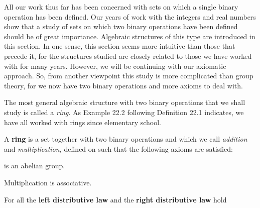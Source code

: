 \documentclass[11pt,oneside]{article}
\begin{document}
\fi
\renewcommand{\BookFooter}{Section 22 Rings and Fields}
\ifdefined\BookMaster\else\setcounter{page}{185}\fi

\BookNarrativetrue

\begin{BookBody}


\noindent All our work thus far has been concerned with sets on which a single binary operation has been defined. Our years of work with the integers and real numbers show that a study of sets on which two binary operations have been defined should be of great importance. Algebraic structures of this type are introduced in this section. In one sense, this section seems more intuitive than those that precede it, for the structures studied are closely related to those we have worked with for many years. However, we will be continuing with our axiomatic approach. So, from another viewpoint this study is more complicated than group theory, for we now have two binary operations and more axioms to deal with.


\noindent The most general algebraic structure with two binary operations that we shall study is called a\textit{ ring}. As Example 22.2 following Definition 22.1 indicates, we have all worked with rings since elementary school.

 A\textbf{ ring}  is a set  together with two binary operations \BookInline{+ } and \BookInline{\cdot,\allowbreak } which we call \textit{addition} and\textit{ multiplication,} defined on  such that the following axioms are satisfied:

 is an abelian group.

 Multiplication is associative.

 For all  the\textbf{ left distributive law} and the\textbf{ right distributive law}  hold\BookEnd{\blacksquare}


\end{BookBody}
\end{document}
